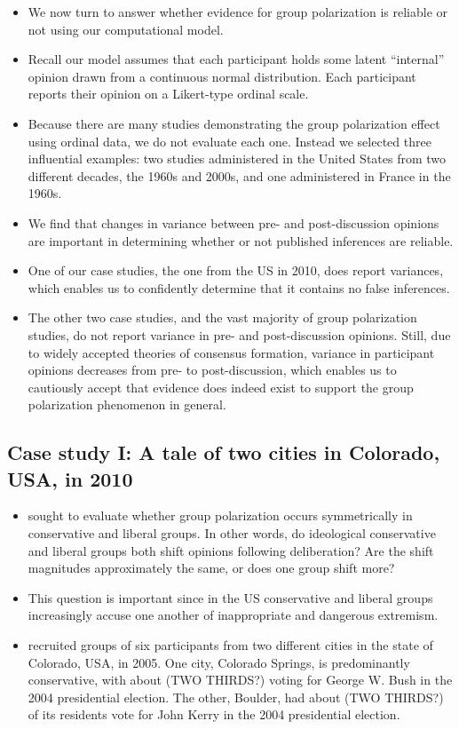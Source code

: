 \documentclass[11pt,letterpaper]{article}
\begin{document}
\begin{itemize}
  \item 
    We now turn to answer whether evidence for group polarization is reliable
    or not using our computational model.
  \item
    Recall our model assumes that each participant holds some latent ``internal'' opinion
    drawn from a continuous normal distribution. Each participant reports 
    their opinion on a Likert-type ordinal scale. 
  \item
    Because there are many studies demonstrating the group polarization effect
    using ordinal data, we do not evaluate each one. Instead we selected 
    three influential examples: two studies administered in the United States
    from two different decades, the 1960s and 2000s, and one administered in 
    France in the 1960s.
  \item
    We find that changes in variance between pre- and post-discussion opinions
    are important in determining whether or not published inferences are reliable.
  \item
    One of our case studies, the one from the US in 2010, does report variances,
    which enables us to confidently determine that it contains no false inferences.
  \item
    The other two case studies, and the vast majority of group polarization
    studies, do not report variance in pre- and post-discussion opinions.
    Still, due to widely accepted theories of consensus formation, variance
    in participant opinions decreases from pre- to post-discussion, which 
    enables us to cautiously accept that evidence does indeed exist to support
    the group polarization phenomenon in general.
\end{itemize}

\subsection{Case study I: A tale of two cities in Colorado, USA, in 2010}


  \begin{itemize}
    \item 
       sought to evaluate whether group 
      polarization occurs symmetrically in conservative and liberal groups.
      In other words, do ideological conservative and liberal groups both
      shift opinions following deliberation? Are the shift magnitudes 
      approximately the same, or does one group shift more?
    \item
      This question is important since in the US conservative and liberal
      groups increasingly accuse one another of inappropriate and
      dangerous extremism.
    \item
       recruited groups of six participants from
      two different cities in the state of Colorado, USA, in 2005. One city,
      Colorado Springs, is predominantly conservative, with about (TWO THIRDS?)
      voting for George W. Bush in the 2004 presidential election. The other,
      Boulder, had about (TWO THIRDS?) of its residents vote for John Kerry
      in the 2004 presidential election. 
  \end{itemize}
      
\end{document}
